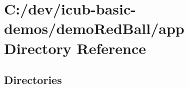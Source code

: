\section{C\+:/dev/icub-\/basic-\/demos/demo\+Red\+Ball/app Directory Reference}
\label{dir_09c3d1dd163a66c44752029483303db0}
\subsection*{Directories}
\begin{DoxyCompactItemize}
\end{DoxyCompactItemize}
